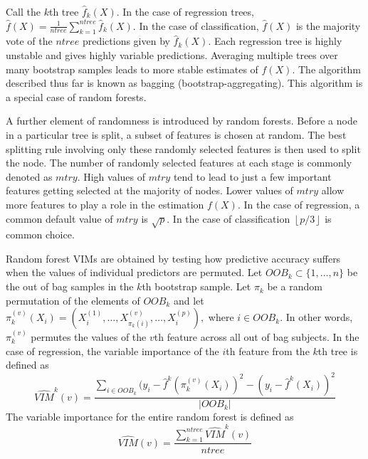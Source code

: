 \documentclass[article,shortnames]{jss}
\begin{document}
Call the $k$th tree $\hat{f}_{k}(X)$.  In the case of regression trees,
$\hat{f}(X)=\frac{1}{ntree}\sum_{k=1}^{ntree}\hat{f}_{k}(X)$.  In the case of classification, $\hat{f}(X)$ is the majority vote of the $ntree$ predictions given
by $\hat{f}_{k}(X)$.  Each regression tree is highly unstable and gives highly variable predictions.  Averaging multiple trees over
many bootstrap samples leads to more stable estimates of $f(X)$.  The algorithm described thus far is known as bagging (bootstrap-aggregating).  This 
algorithm is a special case of random forests.  

A further element of randomness is introduced by random forests.  Before a node in a particular tree is split, a subset of features is chosen at random.  
The best splitting rule involving only these randomly selected features is then used to split the node.  The number of randomly selected features at each stage is
commonly denoted as $mtry$.  High values of $mtry$ tend to lead to just a few important features getting selected at the majority of nodes.
Lower values of $mtry$ allow more features to play a role in the estimation $f(X)$.  In the case of regression, a common default value of $mtry$ is $\sqrt{p}$.
In the case of classification  $\left\lfloor p/3 \right\rfloor$ is common choice.
  
Random forest VIMs are obtained by testing how predictive accuracy suffers when the values of individual predictors are permuted.  Let $OOB_{k} \subset \{1,\ldots, n\}$ 
be the out of bag samples in the $k$th bootstrap sample.  Let $\pi_{k}$ be a random permutation of the elements of $OOB_{k}$ and let   
$\pi_{k}^{(v)}(X_{i}) = (X_{i}^{(1)},\ldots,X_{\pi_{k}(i)}^{(v)},\ldots,X_{i}^{(p)}),$ where $i \in OOB_{k}$.   In other words, $\pi_{k}^{(v)}$ 
permutes the values of the $v$th feature across all out of bag subjects.  In the case of regression, the variable importance of the $i$th feature from the $k$th tree is defined as
\begin{equation}
\widehat{VIM}^{k}(v)= \frac{\sum_{i \in OOB_{k}}(y_{i}-\hat{f}^{k}(\pi_{k}^{(v)}(X_{i}))^{2} - (y_{i} - \hat{f}^{k}(X_{i}))^{2}}{|OOB_{k}|}
\end{equation}
The variable importance for the entire random forest is defined as
\begin{equation}
\widehat{VIM}(v) = \frac{\sum_{k=1}^{ntree}\widehat{VIM}^{k}(v)}{ntree}
\end{equation}
\end{document}
